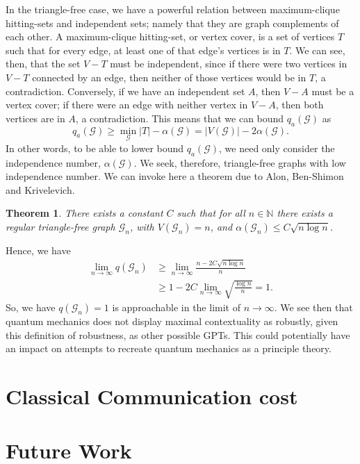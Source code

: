 \documentclass{amsart}
\newtheorem{thm}{Theorem}
\theoremstyle{definition}
\begin{document}
In the triangle-free case, we have a powerful relation between maximum-clique hitting-sets and independent sets; namely that they are graph complements of each other. A maximum-clique hitting-set, or vertex cover, is a set of vertices $T$ such that for every edge, at least one of that edge's vertices is in $T$. We can see, then, that the set $V-T$ must be independent, since if there were two vertices in $V-T$ connected by an edge, then neither of those vertices would be in $T$, a contradiction. Conversely, if we have an independent set $A$, then $V-A$ must be a vertex cover; if there were an edge with neither vertex in $V-A$, then both vertices are in $A$, a contradiction. This means that we can bound $q_a(\mathcal{G})$ as
\begin{equation}
q_a(\mathcal{G})\geq \min_\mathcal{G} |T| - \alpha(\mathcal{G}) = |V(\mathcal{G})|-2\alpha(\mathcal{G}).
\end{equation}
In other words, to be able to lower bound $q_a(\mathcal{G})$, we need only consider the independence number, $\alpha(\mathcal{G})$. We seek, therefore, triangle-free graphs with low independence number. We can invoke here a theorem due to Alon, Ben-Shimon and Krivelevich.\cite{Alon2010}
\begin{thm}
There exists a constant $C$ such that for all $n\in\mathbb{N}$ there exists a regular triangle-free graph $\mathcal{G}_n$, with $V(\mathcal{G}_n)=n$, and $\alpha(\mathcal{G}_n)\leq C\sqrt{n\log n}$.
\end{thm}

Hence, we have
\begin{align}
\lim_{n\rightarrow\infty}q(\mathcal{G}_n)&\geq\lim_{n\rightarrow\infty}\frac{n-2C\sqrt{n\log n}}{n}\\
&\geq 1-2C\lim_{n\rightarrow\infty}\sqrt{\frac{\log n}{n}}=1.
\end{align}
So, we have $q(\mathcal{G}_n)=1$ is approachable in the limit of $n\rightarrow\infty$. We see then that quantum mechanics does not display maximal contextuality as robustly, given this definition of robustness, as other possible GPTs. This could potentially have an impact on attempts to recreate quantum mechanics as a principle theory.

\FloatBarrier
\section{Classical Communication cost}

\section{Future Work}



{}

\end{document}
